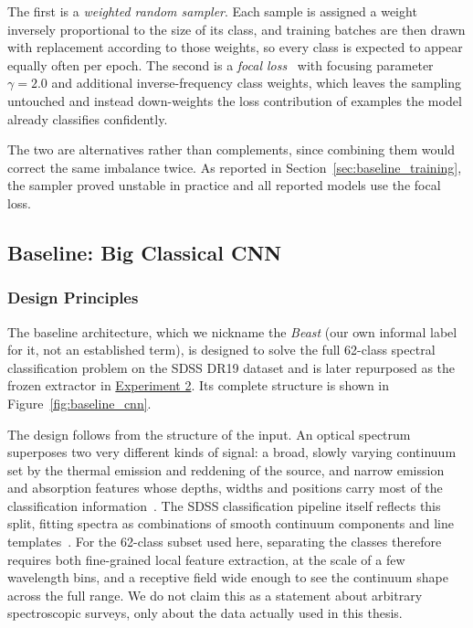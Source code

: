 The first is a \emph{weighted random sampler}. Each sample is assigned a weight inversely
proportional to the size of its class, and training batches are then drawn with
replacement according to those weights, so every class is expected to appear equally often
per epoch. The second is a \emph{focal loss}~\cite{lin2018focalloss} with focusing
parameter $\gamma = 2.0$ and additional inverse-frequency class weights, which leaves the
sampling untouched and instead down-weights the loss contribution of examples the model
already classifies confidently.

The two are alternatives rather than complements, since combining them would correct the
same imbalance twice. As reported in Section~\ref{sec:baseline_training}, the sampler
proved unstable in practice and all reported models use the focal loss.



\subsection{Baseline: Big Classical CNN}
\label{sec:baseline_cnn}

\subsubsection{Design Principles}
\label{sec:baseline_philosophy}

The baseline architecture, which we nickname the \emph{Beast} (our own informal label for
it, not an established term), is designed to solve the full 62-class spectral
classification problem on the SDSS DR19 dataset and is later repurposed as the frozen
extractor in \hyperref[sec:exp2_methods]{Experiment 2}. Its complete structure is shown in
Figure~\ref{fig:baseline_cnn}.

The design follows from the structure of the input. An optical spectrum superposes two
very different kinds of signal: a broad, slowly varying continuum set by the thermal
emission and reddening of the source, and narrow emission and absorption features whose
depths, widths and positions carry most of the classification
information~\cite{gray2005photospheres}. The SDSS classification pipeline itself reflects
this split, fitting spectra as combinations of smooth continuum components and line
templates~\cite{bolton2012boss}. For the 62-class subset used here, separating the classes
therefore requires both fine-grained local feature extraction, at the scale of a few
wavelength bins, and a receptive field wide enough to see the continuum shape across the
full range. We do not claim this as a statement about arbitrary spectroscopic surveys, only
about the data actually used in this thesis.

